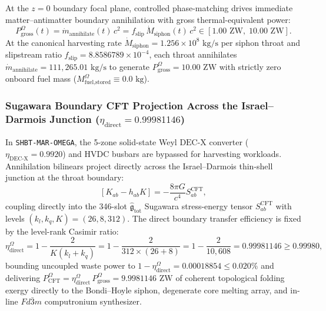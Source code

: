 \documentclass[11pt,onecolumn]{article}
\begin{document}
At the $z=0$ boundary focal plane, controlled phase-matching drives immediate matter--antimatter boundary annihilation with gross thermal-equivalent power:
\begin{equation}
P_{\text{gross}}^{\Omega}(t) = \dot{m}_{\text{annihilate}}(t)\,c^2 = f_{\text{slip}}\,\dot{M}_{\text{siphon}}(t)\,c^2 \in [1.00\text{ ZW},\;10.00\text{ ZW}].
\label{eq:mar_omega_gross_power}
\end{equation}
At the canonical harvesting rate $\dot{M}_{\text{siphon}} = 1.256 \times 10^8\text{ kg/s}$ per siphon throat and slipstream ratio $f_{\text{slip}} = 8.8586789 \times 10^{-4}$, each throat annihilates $\dot{m}_{\text{annihilate}} = 111{,}265.01\text{ kg/s}$ to generate $P_{\text{gross}}^{\Omega} = 10.00\text{ ZW}$ with strictly zero onboard fuel mass ($M_{\text{fuel,stored}}^{\Omega} \equiv 0.0\text{ kg}$).

\subsubsection{Sugawara Boundary CFT Projection Across the Israel--Darmois Junction ($\eta_{\text{direct}} = 0.99981146$)}
In \texttt{SHBT-MAR-OMEGA}, the 5-zone solid-state Weyl $\text{DEC-X}$ converter ($\eta_{\text{DEC-X}} = 0.9920$) and HVDC busbars are bypassed for harvesting workloads. Annihilation bilinears project directly across the Israel--Darmois thin-shell junction at the throat boundary:
\begin{equation}
\left[K_{ab} - h_{ab}K\right] = -\frac{8\pi G}{c^4} S_{ab}^{\text{CFT}},
\label{eq:mar_omega_israel_darmois}
\end{equation}
coupling directly into the 346-slot $\hat{\mathfrak{g}}_{\text{tot}}$ Sugawara stress-energy tensor $S_{ab}^{\text{CFT}}$ with levels $(k_l, k_q, K) = (26, 8, 312)$. The direct boundary transfer efficiency is fixed by the level-rank Casimir ratio:
\begin{equation}
\eta_{\text{direct}}^{\Omega} = 1 - \frac{2}{K(k_l + k_q)} = 1 - \frac{2}{312 \times (26 + 8)} = 1 - \frac{2}{10{,}608} = 0.99981146 \ge 0.99980,
\label{eq:mar_omega_direct_cft_eff}
\end{equation}
bounding uncoupled waste power to $1 - \eta_{\text{direct}}^{\Omega} = 0.00018854 \le 0.020\%$ and delivering $P_{\text{CFT}}^{\Omega} = \eta_{\text{direct}}^{\Omega}\,P_{\text{gross}}^{\Omega} = 9.9981146\text{ ZW}$ of coherent topological folding exergy directly to the Bondi--Hoyle siphon, degenerate core melting array, and in-line $Fd\bar{3}m$ computronium synthesizer.
\end{document}
